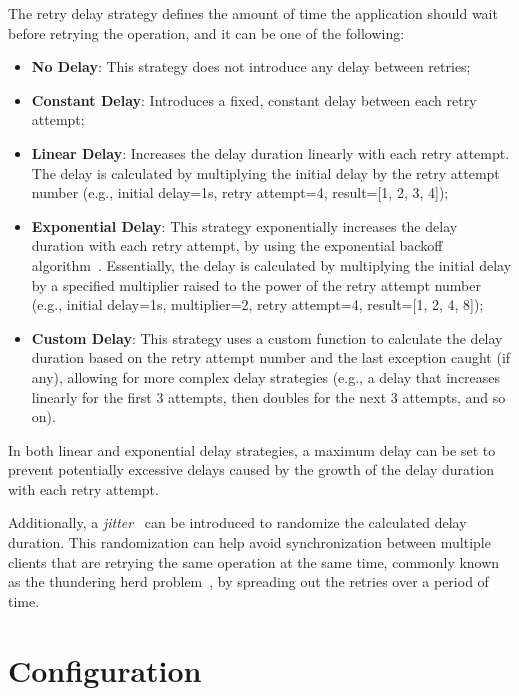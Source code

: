The retry delay strategy defines the amount of time the application should wait before retrying the operation, and it can be one of the following:

\begin{itemize}
    \item \textbf{No Delay}: This strategy does not introduce any delay between retries;
    \item \textbf{Constant Delay}: Introduces a fixed, constant delay between each retry attempt;
    \item \textbf{Linear Delay}: Increases the delay duration linearly with each retry attempt.
    The delay is calculated by multiplying the initial delay by the retry attempt number (e.g., initial delay=1s, retry attempt=4, result=[1, 2, 3, 4]);
    \item \textbf{Exponential Delay}: This strategy exponentially increases the delay duration with each retry attempt, by using the exponential backoff algorithm~\cite{wiki:exponential-backoff}.
    Essentially, the delay is calculated by multiplying the initial delay by a specified multiplier raised to the power of the retry attempt number (e.g., initial delay=1s, multiplier=2, retry attempt=4, result=[1, 2, 4, 8]);
    \item \textbf{Custom Delay}: This strategy uses a custom function to calculate the delay duration based on the retry attempt number and the last exception caught (if any), allowing for more complex delay strategies (e.g., a delay that increases linearly for the first 3 attempts, then doubles for the next 3 attempts, and so on).
\end{itemize}

In both linear and exponential delay strategies, a maximum delay can be set to prevent potentially excessive delays caused by the growth of the delay duration with each retry attempt.

Additionally, a \textit{jitter}~\cite{wiki:jitter} can be introduced to randomize the calculated delay duration.
This randomization can help avoid synchronization between multiple clients that are retrying the same operation at the same time, commonly known as the thundering herd problem~\cite{wiki:thundering-herd-problem}, by spreading out the retries over a period of time.


\section{Configuration}\label{sec:retry-configuration}

